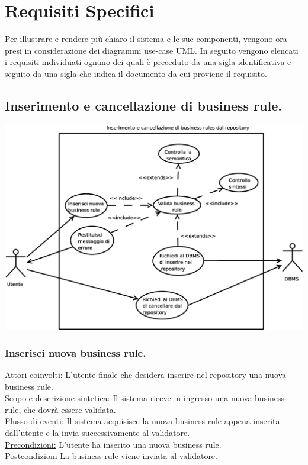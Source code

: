 \documentclass[11pt,titlepage,a4paper]{report}
\begin{document}
\chapter{Requisiti Specifici}
Per illustrare e rendere pi\`u chiaro il sistema e le sue componenti, vengono ora presi in considerazione dei diagrammi use-case UML. In seguito vengono elencati i requisiti individuati ognuno dei quali \`e preceduto da una sigla identificativa e seguito da una sigla che indica il documento da cui proviene il requisito.


\section{Inserimento e cancellazione di business rule.}
\begin{center}
 \includegraphics[width=1\textwidth]{Inserisci-regola.eps}
\end{center}

\subsection{Inserisci nuova business rule.}
\underline{Attori coinvolti:} L'utente finale che desidera inserire nel repository una nuova business rule.\\
\underline{Scopo e descrizione sintetica:} Il sistema riceve in ingresso una nuova business rule, che dovr\`a essere validata.\\
\underline{Flusso di eventi:} Il sistema acquisisce la nuova business rule appena inserita dall'utente e la invia successivamente al validatore.\\
\underline{Precondizioni:} L'utente ha inserito una nuova business rule.\\
\underline{Postcondizioni} La business rule viene inviata al validatore.
\end{document}
